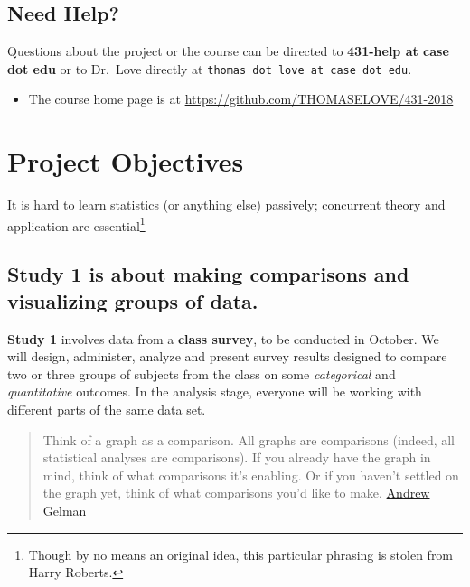 \documentclass[]{book}
\providecommand{\tightlist}{%
  \setlength{\itemsep}{0pt}\setlength{\parskip}{0pt}}
\let\rmarkdownfootnote\footnote%
\def\footnote{\protect\rmarkdownfootnote}
\theoremstyle{definition}
\theoremstyle{definition}
\theoremstyle{definition}
\theoremstyle{remark}
\begin{document}
\hypertarget{need-help}{%
\section*{Need Help?}\label{need-help}}

Questions about the project or the course can be directed to
\textbf{431-help at case dot edu} or to Dr.~Love directly at
\texttt{thomas\ dot\ love\ at\ case\ dot\ edu}.

\begin{itemize}
\tightlist
\item
  The course home page is at
  \url{https://github.com/THOMASELOVE/431-2018}
\end{itemize}

\hypertarget{project-objectives}{%
\chapter{Project Objectives}\label{project-objectives}}

It is hard to learn statistics (or anything else) passively; concurrent
theory and application are
essential\footnote{Though by no means an original idea, this particular phrasing is stolen from Harry Roberts.}

\hypertarget{study-1-is-about-making-comparisons-and-visualizing-groups-of-data.}{%
\section{Study 1 is about making comparisons and visualizing groups of
data.}\label{study-1-is-about-making-comparisons-and-visualizing-groups-of-data.}}

\textbf{Study 1} involves data from a \textbf{class survey}, to be
conducted in October. We will design, administer, analyze and present
survey results designed to compare two or three groups of subjects from
the class on some \emph{categorical} and \emph{quantitative} outcomes.
In the analysis stage, everyone will be working with different parts of
the same data set.

\begin{quote}
Think of a graph as a comparison. All graphs are comparisons (indeed,
all statistical analyses are comparisons). If you already have the graph
in mind, think of what comparisons it's enabling. Or if you haven't
settled on the graph yet, think of what comparisons you'd like to make.
\href{http://andrewgelman.com/2014/03/25/statistical-graphics-course-statistical-graphics-advice/}{Andrew
Gelman}
\end{quote}
\end{document}
